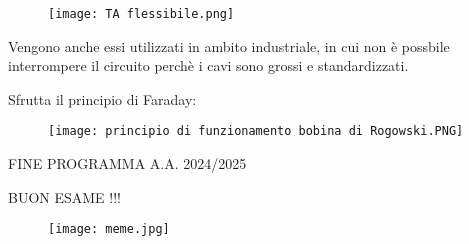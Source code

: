 \begin{figure}[h]
    \centering
    \texttt{[image: TA flessibile.png]}
\end{figure}

Vengono anche essi utilizzati in ambito industriale, in cui non è possbile interrompere il circuito perchè i cavi sono grossi e standardizzati. \newline 

Sfrutta il principio di Faraday: 

\begin{figure}[h]
    \centering
    \texttt{[image: principio di funzionamento bobina di Rogowski.PNG]}
\end{figure}

\newpage 

FINE PROGRAMMA A.A. 2024/2025 \newline 

BUON ESAME !!!


\begin{figure}[h]
    \centering
    \texttt{[image: meme.jpg]}
\end{figure}



